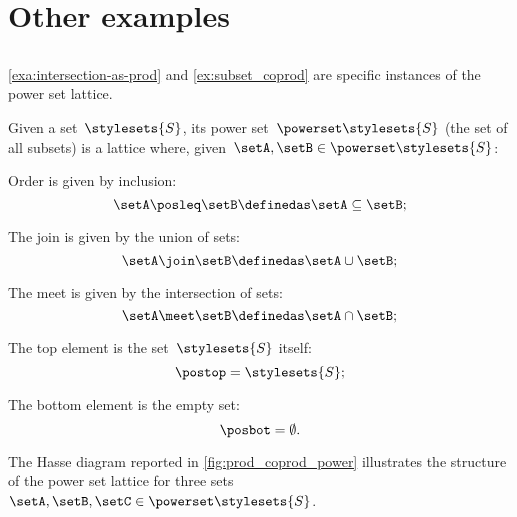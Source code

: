 \section{Other examples}

\subsection{}
\cref{exa:intersection-as-prod} and \cref{ex:subset_coprod} are specific instances of the power set lattice.

\begin{definition}
  \label{def:power-set-as-lattice}
Given a set~$\stylesets{S}$, its power set~$\powerset \stylesets{S}$ (the set of all subsets) is a lattice where, given~$\setA,\setB\in \powerset \stylesets{S}$:
\begin{compactitem}
  \item Order is given by inclusion:
  \begin{equation*}
    \setA\posleq \setB \definedas \setA\subseteq \setB;
  \end{equation*}
  \item The join is given by the union of sets:
  \begin{equation*}
    \setA\join \setB \definedas \setA\cup \setB;
  \end{equation*}
  \item The meet is given by the intersection of sets:
  \begin{equation*}
    \setA\meet \setB \definedas \setA\cap \setB;
  \end{equation*}
  \item The top element is the set~$\stylesets{S}$ itself:
  \begin{equation*}
    \postop = \stylesets{S};
  \end{equation*}
  \item The bottom element is the empty set:
  \begin{equation*}
    \posbot = \emptyset.
  \end{equation*}
\end{compactitem}
\end{definition}

The Hasse diagram reported in \cref{fig:prod_coprod_power} illustrates the structure of the power set lattice for three sets~$\setA,\setB,\setC\in \powerset \stylesets{S}$.

